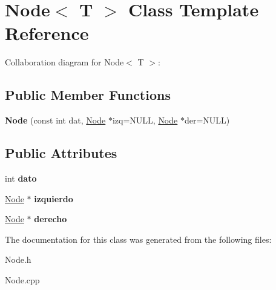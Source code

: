 \hypertarget{classNode}{}\section{Node$<$ T $>$ Class Template Reference}
\label{classNode}


Collaboration diagram for Node$<$ T $>$\+:
\subsection*{Public Member Functions}
\begin{DoxyCompactItemize}
\item 
\mbox{\label{classNode_a7dc6ec33edfb1d955fc0aec6e1ff74a8}} 
{\bfseries Node} (const int dat, \hyperlink{classNode}{Node} $\ast$izq=N\+U\+LL, \hyperlink{classNode}{Node} $\ast$der=N\+U\+LL)
\end{DoxyCompactItemize}
\subsection*{Public Attributes}
\begin{DoxyCompactItemize}
\item 
\mbox{\label{classNode_a2979b0076a4c88753847b1178911a24c}} 
int {\bfseries dato}
\item 
\mbox{\label{classNode_a1c901b88f2ced226793371026b8efd3b}} 
\hyperlink{classNode}{Node} $\ast$ {\bfseries izquierdo}
\item 
\mbox{\label{classNode_a0afb6ecfe00f0b513f1740329c69e08b}} 
\hyperlink{classNode}{Node} $\ast$ {\bfseries derecho}
\end{DoxyCompactItemize}


The documentation for this class was generated from the following files\+:\begin{DoxyCompactItemize}
\item 
Node.\+h\item 
Node.\+cpp\end{DoxyCompactItemize}
